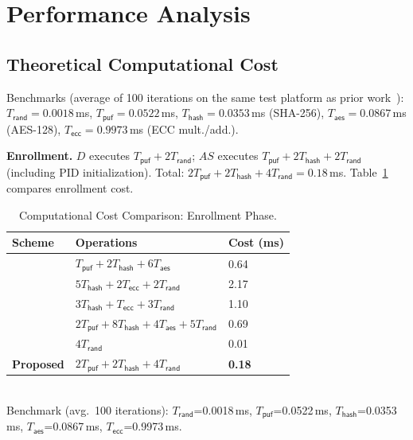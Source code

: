 \documentclass[conference]{IEEEtran}
\begin{document}
\section{Performance Analysis}

\subsection{Theoretical Computational Cost}

Benchmarks (average of 100 iterations on the same test platform as prior
work~\cite{rosa2023lightsae}): $T_\mathsf{rand} = 0.0018$\,ms,
$T_\mathsf{puf} = 0.0522$\,ms,
$T_\mathsf{hash} = 0.0353$\,ms (SHA-256),
$T_\mathsf{aes} = 0.0867$\,ms (AES-128),
$T_\mathsf{ecc} = 0.9973$\,ms (ECC mult./add.).

\textbf{Enrollment.}  $D$ executes $T_\mathsf{puf} + 2T_\mathsf{rand}$;
$AS$ executes $T_\mathsf{puf} + 2T_\mathsf{hash} + 2T_\mathsf{rand}$
(including PID initialization).  Total:
$2T_\mathsf{puf} + 2T_\mathsf{hash} + 4T_\mathsf{rand} = 0.18$\,ms.
Table~\ref{tab:comp_enroll} compares enrollment cost.

\begin{table}[!t]
  \centering
  \caption{Computational Cost Comparison: Enrollment Phase.}
  \label{tab:comp_enroll}
  \scriptsize
  \setlength{\tabcolsep}{3pt}
  \begin{tabular}{lll}
    \toprule
    Scheme & Operations & Cost (ms) \\
    \midrule
    \cite{alruwaili2025raaf} & $T_\mathsf{puf}+2T_\mathsf{hash}+6T_\mathsf{aes}$ & 0.64 \\
    \cite{yang2024sakms}     & $5T_\mathsf{hash}+2T_\mathsf{ecc}+2T_\mathsf{rand}$ & 2.17 \\
    \cite{li2020puf}         & $3T_\mathsf{hash}+T_\mathsf{ecc}+3T_\mathsf{rand}$ & 1.10 \\
    \cite{zheng2022puf}      & $2T_\mathsf{puf}+8T_\mathsf{hash}+4T_\mathsf{aes}+5T_\mathsf{rand}$ & 0.69 \\
    \cite{rosa2023lightsae}  & $4T_\mathsf{rand}$ & 0.01 \\
    \textbf{Proposed}        & $2T_\mathsf{puf}+2T_\mathsf{hash}+4T_\mathsf{rand}$ & \textbf{0.18} \\
    \bottomrule
  \end{tabular}\\[3pt]
  \scriptsize
  Benchmark (avg.\ 100 iterations): $T_\mathsf{rand}$=0.0018\,ms, $T_\mathsf{puf}$=0.0522\,ms,
  $T_\mathsf{hash}$=0.0353\,ms, $T_\mathsf{aes}$=0.0867\,ms, $T_\mathsf{ecc}$=0.9973\,ms.
\end{table}
\end{document}
